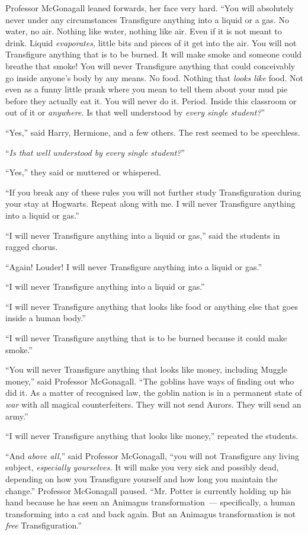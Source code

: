 Professor McGonagall leaned forwards, her face very hard. ``You will absolutely never under any circumstances Transfigure anything into a liquid or a gas. No water, no air. Nothing like water, nothing like air. Even if it is not meant to drink. Liquid \emph{evaporates,} little bits and pieces of it get into the air. You will not Transfigure anything that is to be burned. It will make smoke and someone could breathe that smoke! You will never Transfigure anything that could conceivably go inside anyone's body by any means. No food. Nothing that \emph{looks like} food. Not even as a funny little prank where you mean to tell them about your mud pie before they actually eat it. You will never do it. Period. Inside this classroom or out of it or \emph{anywhere.} Is that well understood by \emph{every single student?}''

``Yes,'' said Harry, Hermione, and a few others. The rest seemed to be speechless.

``\emph{Is that well understood by every single student?}''

``Yes,'' they said or muttered or whispered.

``If you break any of these rules you will not further study Transfiguration during your stay at Hogwarts. Repeat along with me. I will never Transfigure anything into a liquid or gas.''

``I will never Transfigure anything into a liquid or gas,'' said the students in ragged chorus.

``Again! Louder! I will never Transfigure anything into a liquid or gas.''

``I will never Transfigure anything into a liquid or gas.''

``I will never Transfigure anything that looks like food or anything else that goes inside a human body.''

``I will never Transfigure anything that is to be burned because it could make smoke.''

``You will never Transfigure anything that looks like money, including Muggle money,'' said Professor McGonagall. ``The goblins have ways of finding out who did it. As a matter of recognised law, the goblin nation is in a permanent state of \emph{war} with all magical counterfeiters. They will not send Aurors. They will send an army.''

``I will never Transfigure anything that looks like money,'' repeated the students.

``And \emph{above all},'' said Professor McGonagall, ``you will not Transfigure any living subject, \emph{especially yourselves.} It will make you very sick and possibly dead, depending on how you Transfigure yourself and how long you maintain the change.'' Professor McGonagall paused. ``Mr. Potter is currently holding up his hand because he has seen an Animagus transformation~--- specifically, a human transforming into a cat and back again. But an Animagus transformation is not \emph{free} Transfiguration.''

